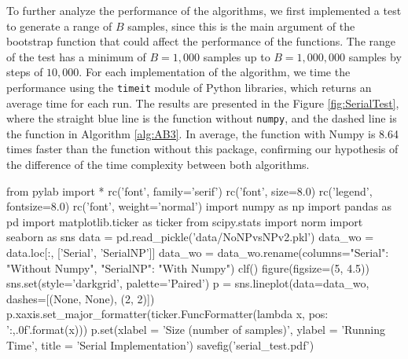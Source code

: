\documentclass[11pt]{article}
\begin{document}
\medskip

To further analyze the performance of the algorithms, we first implemented a test to generate a range of $B$ samples, since
this is the main argument of the bootstrap function that could affect the performance of the functions. The range of the test
has a minimum of $B = 1,000$ samples up to $B = 1,000,000$ samples by steps of $10,000$. For each implementation of the
algorithm, we time the performance using the \texttt{timeit} module of Python libraries, which returns an average time for
each run. The results are presented in the Figure \ref{fig:SerialTest}, where the straight blue line is the function
without \texttt{numpy}, and the dashed line is the function in Algorithm \ref{alg:AB3}. In average, the function with Numpy
is 8.64 times faster than the function without this package, confirming our hypothesis of the difference of the time complexity
between both algorithms.

\medskip

\begin{pycode}
from pylab import *
rc('font', family='serif')
rc('font', size=8.0)
rc('legend', fontsize=8.0)
rc('font', weight='normal')
import numpy as np
import pandas as pd
import matplotlib.ticker as ticker
from scipy.stats import norm
import seaborn as sns
data = pd.read_pickle('data/NoNPvsNPv2.pkl')
data_wo = data.loc[:, ['Serial', 'SerialNP']]
data_wo = data_wo.rename(columns={"Serial": "Without Numpy", "SerialNP": "With Numpy"})
clf()
figure(figsize=(5, 4.5))
sns.set(style='darkgrid', palette='Paired')
p = sns.lineplot(data=data_wo, dashes=[(None, None), (2, 2)])
p.xaxis.set_major_formatter(ticker.FuncFormatter(lambda x, pos: '{:,.0f}'.format(x)))
p.set(xlabel = 'Size (number of samples)', ylabel = 'Running Time', title = 'Serial Implementation')
savefig('serial_test.pdf')
\end{pycode}
\end{document}
